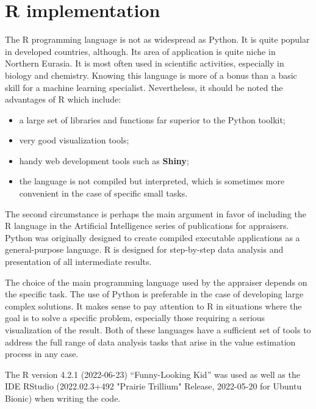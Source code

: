 \documentclass[]{scrreprt}
\begin{document}
\section{R implementation}\label{U-test-R}
%
%
The R programming language is not as widespread as Python. It is quite popular in developed countries, although. Its area of application is quite niche in Northern Eurasia. It is most often used in scientific activities, especially in biology and chemistry. Knowing this language is more of a bonus than a basic skill for a machine learning specialist. Nevertheless, it should be noted the advantages of R which include:
\begin{itemize}
	\item a large set of libraries and functions far superior to the Python toolkit;
	\item very good visualization tools;
	\item handy web development tools such as \textbf{Shiny};
	\item the language is not compiled but interpreted, which is sometimes more convenient in the case of specific small tasks.
\end{itemize}
The second circumstance is perhaps the main argument in favor of including the R language in the Artificial Intelligence series of publications for appraisers. Python was originally designed to create compiled executable applications as a general-purpose language. R is designed for step-by-step data analysis and presentation of all intermediate results.

The choice of the main programming language used by the appraiser depends on the specific task. The use of Python is preferable in the case of developing large complex solutions. It makes sense to pay attention to R in situations where the goal is to solve a specific problem, especially those requiring a serious visualization of the result. Both of these languages have a sufficient set of tools to address the full range of data analysis tasks that arise in the value estimation process in any case.

The R version 4.2.1 (2022-06-23) ``Funny-Looking Kid'' was used as well as the IDE RStudio (2022.02.3+492 "Prairie Trillium" Release, 2022-05-20 for Ubuntu Bionic) when writing the code.
\end{document}
